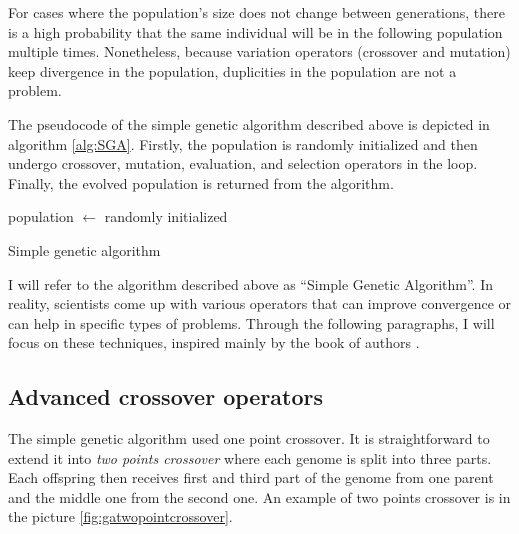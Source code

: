 For cases where the population's size does not change between generations, there is a high probability that the same individual will be in the following population multiple times. Nonetheless, because variation operators (crossover and mutation) keep divergence in the population, duplicities in the population are not a problem.

The pseudocode of the simple genetic algorithm described above is depicted in algorithm \ref{alg:SGA}. Firstly, the population is randomly initialized and then undergo crossover, mutation, evaluation, and selection operators in the loop. Finally, the evolved population is returned from the algorithm.

\begin{algorithm}
    population $\leftarrow$ randomly initialized\;
    \caption{Simple genetic algorithm}
    \label{alg:SGA}
\end{algorithm}

I will refer to the algorithm described above as \enquote{Simple Genetic Algorithm}. In reality, scientists come up with various operators that can improve convergence or can help in specific types of problems. Through the following paragraphs, I will focus on these techniques, inspired mainly by the book of authors \citet*{IntroToGA}.

\subsection{Advanced crossover operators}

The simple genetic algorithm used one point crossover. It is straightforward to extend it into \emph{two points crossover} where each genome is split into three parts. Each offspring then receives first and third part of the genome from one parent and the middle one from the second one. An example of two points crossover is in the picture \ref{fig:gatwopointcrossover}.

